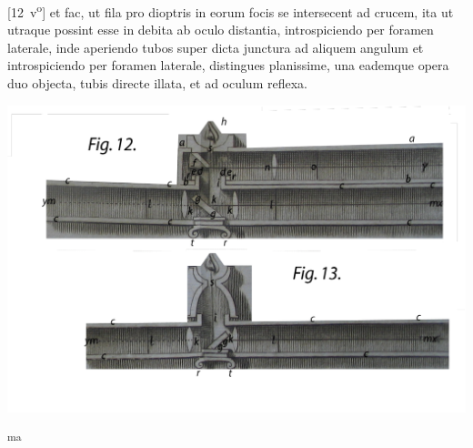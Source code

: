 \hspace{-0.6mm}[12~v\textsuperscript{o}] et fac, ut fila pro dioptris in eorum focis se intersecent ad crucem, ita ut utraque possint esse in debita ab oculo distantia, introspiciendo per foramen laterale, inde aperiendo tubos super dicta junctura ad aliquem angulum et introspiciendo per foramen laterale, distingues planissime, una eademque opera duo objecta, tubis directe illata, et ad oculum reflexa. 
\pend
\vspace{1.2em}
\count{}
\count{}
\count{}
\begin{center}   
\centering                 
\includegraphics[trim = 0mm 1mm 0mm 2mm, clip, width=1.0\textwidth]{images/LH0351506_012v-dext12.pdf}\newline
\vspace*{3mm}
\end{center}
\pstart{}\textsuperscript{ma} 

